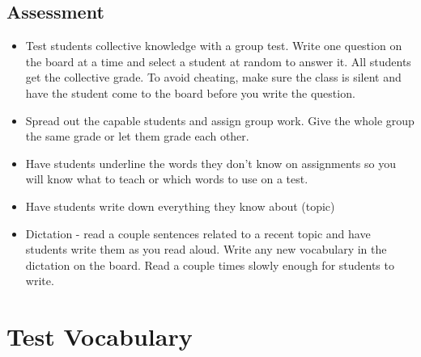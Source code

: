 \subsection{Assessment}
\begin{itemize}
\item Test students collective knowledge with a group test. Write one question
on the board at a time and select a student at random to answer it.
All students get the collective grade. To avoid cheating, make sure
the class is silent and have the student come to the board before
you write the question. 
\item Spread out the capable students and assign group work. Give the whole
group the same grade or let them grade each other. 
\item Have students underline the words they don't know on assignments so
you will know what to teach or which words to use on a test.
\item Have students write down everything they know about (topic)
\item Dictation - read a couple sentences related to a recent topic and
have students write them as you read aloud. Write any new vocabulary
in the dictation on the board. Read a couple times slowly enough for
students to write.
\end{itemize}

\section*{Test Vocabulary}



